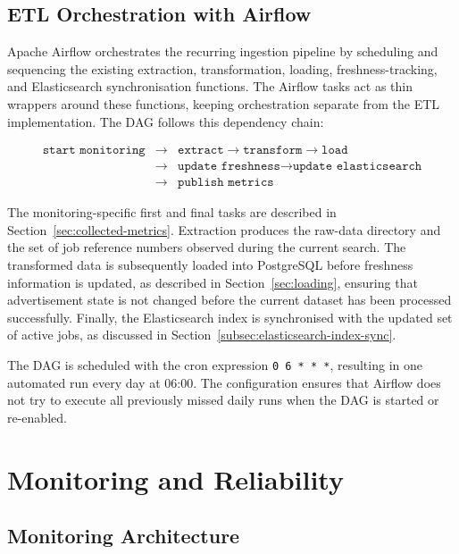 \documentclass[11pt,a4paper]{article}
\begin{document}
\subsection{ETL Orchestration with Airflow}

Apache Airflow orchestrates the recurring ingestion pipeline by scheduling and sequencing the existing extraction, transformation, loading, freshness-tracking, and Elasticsearch synchronisation functions. The Airflow tasks act as thin wrappers around these functions, keeping orchestration separate from the ETL implementation. The DAG follows this dependency chain:

\[
\begin{array}{rcl}
	\texttt{start monitoring}
	& \rightarrow & \texttt{extract} \rightarrow \texttt{transform} \rightarrow \texttt{load} \\
	& \rightarrow & \texttt{update freshness} \rightarrow \texttt{update elasticsearch} \\
	& \rightarrow & \texttt{publish metrics}
\end{array}
\]

The monitoring-specific first and final tasks are described in Section~\ref{sec:collected-metrics}. Extraction produces the raw-data directory and the set of job reference numbers observed during the current search. The transformed data is subsequently loaded into PostgreSQL before freshness information is updated, as described in Section~\ref{sec:loading}, ensuring that advertisement state is not changed before the current dataset has been processed successfully. Finally, the Elasticsearch index is synchronised with the updated set of active jobs, as discussed in Section~\ref{subsec:elasticsearch-index-sync}.

The DAG is scheduled with the cron expression \texttt{0 6 * * *}, resulting in one automated run every day at 06:00. The configuration  ensures that Airflow does not try to execute all previously missed daily runs when the DAG is started or re-enabled.




\section{Monitoring and Reliability}


\subsection{Monitoring Architecture}
\end{document}
